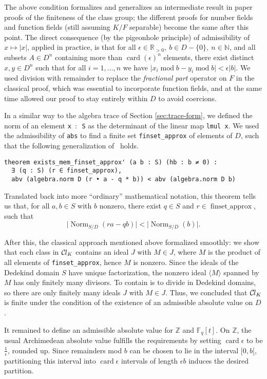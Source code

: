 \documentclass[sn-mathphys]{sn-jnl}%
\newcommand{\lean}[1]{\texttt{#1}\xspace}
\newcommand*{\Cl}{\mathcal{C}\kern-.075em l}
\newcommand*{\Fq}[1][q]{\mathbb{F}_{#1}}
\newcommand{\N}{\mathbb{N}}
\renewcommand{\R}{\mathbb{R}}
\renewcommand{\Z}{\mathbb{Z}}
\DeclareMathOperator{\card}{card}
\DeclareMathOperator{\Mod}{mod}
\begin{document}
The above condition formalizes and generalizes an intermediate result in paper proofs of the finiteness of the class group;
the different proofs for number fields and function fields (still assuming $K/F$ separable) become the same after this point.
The direct consequence (by the pigeonhole principle) of admissibility of $x \mapsto \lvert x \rvert $, applied in practice,
is that for all $\epsilon \in \R_{>0},\ b \in D-\{0\},\ n \in \N$, and all subsets $A \in D^n$ containing more than $\card(\epsilon)^n$ elements, there exist distinct $x,y \in D^n$ such that for all $i=1, \ldots, n$ we have $\lvert x_i \Mod b - y_i \Mod  b \rvert <\epsilon  \lvert b \rvert$.
We used division with remainder to replace the \emph{fractional part} operator on $F$ in the classical proof, which was essential to incorporate function fields, and at the same time allowed our proof to stay entirely within $D$ to avoid coercions.

In a similar way to the algebra trace of Section \ref{sec:trace-form}, we defined the norm of an element \lean{x $:$ S} as the determinant of the linear map \lean{lmul x}.
We used the admissibility of \lean{abs} to find a finite set \lean{finset\_approx} of elements of $D$,
such that the following generalization of~\cite[Theorem~12.2.1]{Ireland-Rosen} holds.
\begin{lstlisting}
theorem exists_mem_finset_approx' (a b : S) (hb : b ≠ 0) :
  ∃ (q : S) (r ∈ finset_approx),
  abv (algebra.norm D (r • a - q * b)) < abv (algebra.norm D b)
\end{lstlisting}
Translated back into more ``ordinary'' mathematical notation, this theorem tells us that, for all $a, b \in S$ with $b$ nonzero, there exist $q \in S$ and $r \in \operatorname{finset\_approx}$, such that
\[\lvert \operatorname{Norm}_{S/D}(ra-qb)\rvert < \lvert \operatorname{Norm}_{S/D}(b) \rvert.\]

After this, the classical approach mentioned above formalized smoothly:
we show that each class in $\Cl_{K}$ contains an ideal $J$ with $M \in J$,
where $M$ is the product of all elements of \lean{finset\_approx}, hence $M$ is nonzero.
Since the ideals of the Dedekind domain $S$ have unique factorization,
the nonzero ideal $\langle M \rangle$ spanned by $M$ has only finitely many divisors.
To contain is to divide in Dedekind domains, so there are only finitely many ideals $J$ with $M \in J$.
Thus, we concluded that $\Cl_{K}$ is finite under the condition of the existence of an admissible absolute value on $D$.

It remained to define an admissible absolute value for $\Z$ and $\Fq[q][t]$. On $\Z$, the usual Archimedean absolute value fulfills the requirements
by setting $\card \epsilon$ to be $\frac{1}{\epsilon}$, rounded up.
Since remainders mod $b$ can be chosen to lie in the interval $[0, b[$, partitioning this interval into $\card \epsilon$ intervals of length $\epsilon b$ induces the desired partition.
\end{document}
